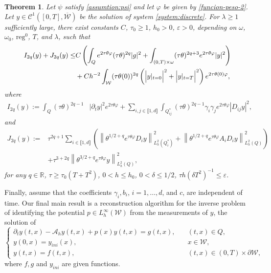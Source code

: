 \documentclass{amsart}
\numberwithin{equation}{section}
\newtheorem{theorem}{Theorem}[section]
\begin{document}
\begin{theorem}\label{theo:Carleman}
Let $\psi$ satisfy \eqref{assumtion:psi} and let $\varphi$ be given by \eqref{funcion-peso-2}. Let $y\in \mathcal{C}^{1}([0,T],\overline{\mathcal{W}})$ be the solution of system \eqref{system:discrete}. For $\lambda\geq 1$ sufficiently large, there exist constants $C$, $\tau_{0}\ge 1$, $h_{0}>0$, $\varepsilon >0$, depending on $\omega$, $\omega_{0}$, $\mathrm{reg}^{0}$, $T$, and $\lambda$, such that
    \begin{align}\label{ine:carleman:semi-discreteNew}
		I_{2q}(y)+J_{2q}(y) 
		\leq&  C\left(\int_Qe^{2\tau\theta\varphi}(\tau\theta)^{2q}|g|^2+\int_{(0,T)\times\omega}(\tau\theta)^{{2q}+3}e^{2\tau\theta\varphi}|y|^2\right)\\
		&+Ch^{-2}\int_{\mathcal{W}} (\tau\theta(0))^{2q}\left(\Big|y|_{t=0}\Big|^2+\Big|y|_{t=T}\Big|^2\right)e^{2\tau\theta(0)\varphi},\notag
	\end{align}
where 
\begin{align*}
     I_{{2q}}(y):= \int_Q(\tau\theta)^{2q-1}&|\partial_{t}y|^2e^{2\tau\theta\varphi}+\sum_{i,j\in\llbracket 1,d\rrbracket}\int_{Q^\ast_{ij}}(\tau\theta)^{2q-1}\gamma_{i}\gamma_{j}e^{2\tau\theta\varphi}|D_{ij}y|^{2},
 \end{align*}
 and
\begin{align*}
J_{2q}(y):= &\tau^{2q+1}\sum_{i\in\llbracket 1,d\rrbracket}\left( \left\|\theta^{1/2+q} e^{\tau\theta\varphi} D_{i}y\right\|^{2}_{L^{2}_{h}(Q^{\ast}_i)}+\left\|\theta^{1/2+q} e^{\tau\theta\varphi}A_{i}D_{i}y\right\|^{2}_{L^{2}_{h}(Q)}\right)\\
&+\tau^{3+2q}\left\|\theta^{3/2+q}e^{\tau\theta\varphi}y\right\|^{2}_{L^{2}_{h}(Q)},
\end{align*} 
for any $q\in\mathbb{R}$, $\tau\geq \tau_{0}(T+T^{2})$, $0<h\leq h_{0}$, $0<\delta \leq 1/2$, $\tau h(\delta T^{2})^{-1}\leq \varepsilon$.
\end{theorem}
Finally, assume that the coefficients $\gamma_i, b_i$, $i=1,\ldots,d$, and $c$, are independent of time. Our final main result is a reconstruction algorithm for the inverse problem of identifying the potential $p\in L^\infty_h({\mathcal{W}})$ from the measurements of $y$, the solution of
\begin{equation}\label{system:coefficient:02}
\begin{cases}
    \partial_{t}y(t,x)-\mathcal{A}_{h}y(t,x)+p(x)y(t,x)=g(t,x),\quad &(t,x)\in Q,\\
    y(0,x)=y_{ini}(x), &x\in\mathcal{W},\\
    y(t,x)=f(t,x), &(t,x)\in(0,T)\times\partial\mathcal{W},
\end{cases}
\end{equation}
where $f,g$ and $y_{ini}$ are given functions. 
\end{document}
